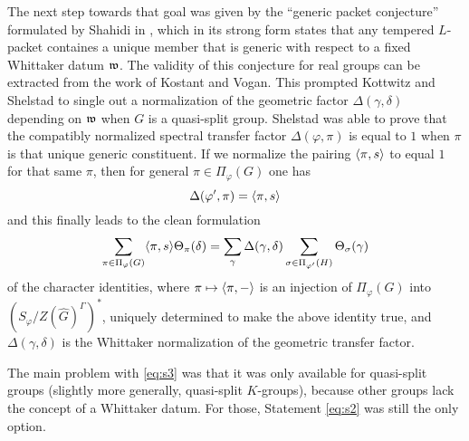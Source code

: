 \documentclass{article}
\theoremstyle{definition}
\numberwithin{equation}{section}
\renewcommand{\-}{\hyp{}}
\begin{document}
The next step towards that goal was given by the ``generic packet conjecture'' formulated by Shahidi in \cite{Sha90}, which in its strong form states that any tempered $L$\-packet containes a unique member that is generic with respect to a fixed Whittaker datum $\mathfrak{w}$. The validity of this conjecture for real groups can be extracted from the work of Kostant and Vogan. This prompted Kottwitz and Shelstad to single out \cite[\S5.3]{KS99} a normalization of the geometric factor $\Delta(\gamma,\delta)$ depending on $\mathfrak{w}$ when $G$ is a quasi-split group. Shelstad was able to prove \cite[Theorem 11.5]{SheTE3} that the compatibly normalized spectral transfer factor $\Delta(\varphi,\pi)$ is equal to $1$ when $\pi$ is that unique generic constituent. If we normalize the pairing $\langle\pi,s\rangle$ to equal $1$ for that same $\pi$, then for general $\pi \in \Pi_\varphi(G)$ one has
\[ \Delta(\varphi',\pi) = \langle\pi,s\rangle \]
and this finally leads to the clean formulation
\begin{equation} \label{eq:s3}
	\sum_{\pi \in \Pi_\varphi(G)}\langle\pi,s\rangle\Theta_\pi(\delta) = \sum_\gamma \Delta(\gamma,\delta)\sum_{\sigma \in \Pi_{\varphi'}(H)} \Theta_{\sigma}(\gamma)
\end{equation}
of the character identities, where $\pi \mapsto \langle\pi,-\rangle$ is an injection of $\Pi_\varphi(G)$ into $(S_\varphi/Z(\hat G)^\Gamma)^*$, uniquely determined to make the above identity true, and $\Delta(\gamma,\delta)$ is the Whittaker normalization of the geometric transfer factor.

The main problem with \eqref{eq:s3} was that it was only available for quasi-split groups (slightly more generally, quasi-split $K$-groups), because other groups lack the concept of a Whittaker datum. For those, Statement \eqref{eq:s2} was still the only option. 
\end{document}

